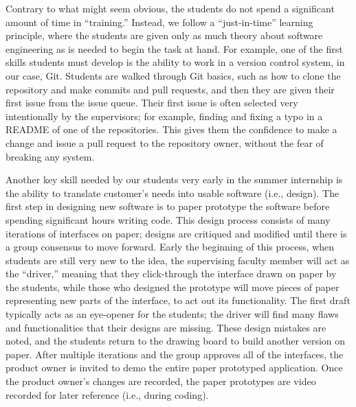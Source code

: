 Contrary to what might seem obvious, the students do not spend a significant amount of time in ``training.'' Instead, we follow a ``just-in-time'' learning principle, where the students are given only as much theory about software engineering as is needed to begin the task at hand. For example, one of the first skills students must develop is the ability to work in a version control system, in our case, Git. Students are walked through Git basics, such as how to clone the repository and make commits and pull requests, and then they are given their first issue from the issue queue. Their first issue is often selected very intentionally by the supervisors; for example, finding and fixing a typo in a README of one of the repositories. This gives them the confidence to make a change and issue a pull request to the repository owner, without the fear of breaking any system. 


Another key skill needed by our students very early in the summer internship is the ability to translate customer's needs into usable software (i.e., design). The first step in designing new software is to paper prototype \cite{2003paperPrototype} the software before spending significant hours writing code. This design process consists of many iterations of interfaces on paper; designs are critiqued and modified until there is a group consensus to move forward. Early the beginning of this process, when students are still very new to the idea, the supervising faculty member will act as the ``driver,'' meaning that they click-through the interface drawn on paper by the students, while those who designed the prototype will move pieces of paper representing new parts of the interface, to act out its functionality. The first draft typically acts as an eye-opener for the students; the driver will find many flaws and functionalities that their designs are missing. These design mistakes are noted, and the students return to the drawing board to build another version on paper. After multiple iterations and the group approves all of the interfaces, the product owner is invited to demo the entire paper prototyped application. Once the product owner's changes are recorded, the paper prototypes are video recorded for later reference (i.e., during coding). 

